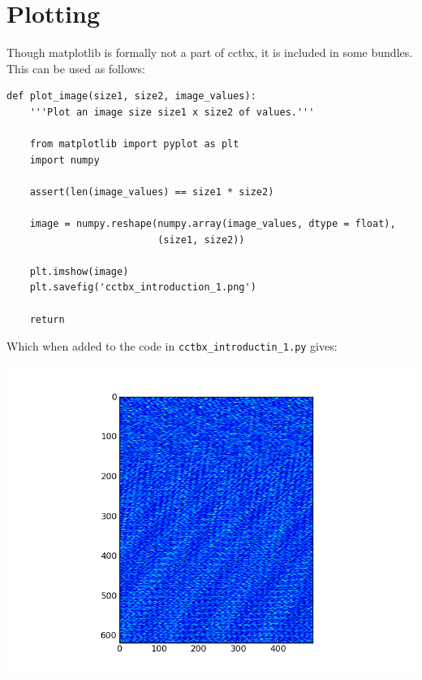 \documentclass[a4paper, 11pt]{article}
\begin{document}
\section{Plotting}

Though matplotlib is formally not a part of cctbx, it is included in some bundles. This can be used as follows:

{\small
\begin{verbatim}
def plot_image(size1, size2, image_values):
    '''Plot an image size size1 x size2 of values.'''

    from matplotlib import pyplot as plt
    import numpy

    assert(len(image_values) == size1 * size2)

    image = numpy.reshape(numpy.array(image_values, dtype = float),
                          (size1, size2))

    plt.imshow(image)
    plt.savefig('cctbx_introduction_1.png')

    return
\end{verbatim}
}

\noindent
Which when added to the code in \verb|cctbx_introductin_1.py| gives:

\includegraphics[scale = 0.5]{cctbx_introduction_1.png}
\end{document}

